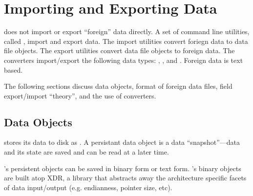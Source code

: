%
%
%
%
%

\section{Importing and Exporting \sr{} Data}
\label{sec:import_export} 

\sr{} does not import or export ``foreign'' data directly. A set of
command line utilities, called , import and export
data.  The import utilities convert foriegn data to \sr{} data file
objects.  The export utilities convert \sr{} data file objects to
foreign data. The converters import/export the following \sr{} data
types: , , and .
Foreign data is text based.

The following sections discuss \sr{} data objects, format of foreign
data files, field export/import ``theory'', and the use of converters.


\subsection{\sr{} Data Objects}
\label{sec:sr_data_object}

\sr{} stores its data to disk as .  A
persistant data object is a data ``snapshot''---data and its state
are saved and can be read at a later time.

\sr{}'s persistent objects can be saved in binary form or text form.
\sr{}'s binary objects are built atop XDR, a library that abstracts
away the architecture specific facets of data input/output (e.g.
endianness, pointer size, etc).


